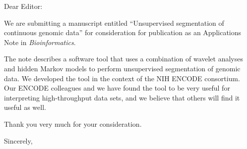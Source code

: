 \documentclass{letter}
\begin{document}
\begin{letter}{}

\opening{Dear Editor:}

We are submitting a manuscript entitled ``Unsupervised segmentation of
continuous genomic data'' for consideration for publication as an
Applications Note in {\em Bioinformatics}.

The note describes a software tool that uses a combination of wavelet
analyses and hidden Markov models to perform unsupervised segmentation
of genomic data.  We developed the tool in the context of the NIH
ENCODE consortium.  Our ENCODE colleagues and we have found the tool
to be very useful for interpreting high-throughput data sets, and we
believe that others will find it useful as well.

Thank you very much for your consideration.

\closing{Sincerely,}

\end{letter}
\end{document}
